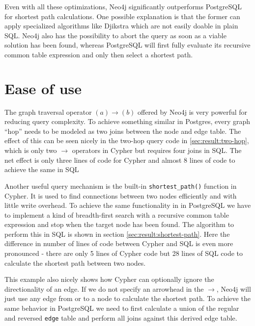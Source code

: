 \documentclass[11pt, a4paper,oneside,chapterprefix=false]{scrbook}
\begin{document}
Even with all these optimizations, Neo4j significantly outperforms PostgreSQL for shortest path calculations.
One possible explanation is that the former can apply specialized algorithms like Djikstra \cite{dijkstra} which are not easily doable in plain SQL. Neo4j also has the possibility to abort the query as soon as a viable solution has been found, whereas PostgreSQL will first fully evaluate its recursive common table expression and only then select a shortest path.

\section{Ease of use} \label{sec:convenience}

The graph traversal operator $(a) \rightarrow (b)$ offered by Neo4j is very powerful for reducing query complexity.
To achieve something similar in Postgres, every graph ``hop'' needs to be modeled as two joins between the node and edge table. The effect of this can be seen nicely in the two-hop query code in \ref{sec:result:two-hop}, which is only two $\rightarrow$ operators in Cypher but requires four joins in SQL. The net effect is only three lines of code for Cypher and almost 8 lines of code to achieve the same in SQL

Another useful query mechanism is the built-in \lstinline{shortest_path()} function in Cypher.
It is used to find connections between two nodes efficiently and with little write overhead.
To achieve the same functionality in in PostgreSQL we have to implement a kind of breadth-first search with a recursive common table expression and stop when the target node has been found.
The algorithm to perform this in SQL is shown in section \ref{sec:result:shortest-path}.
Here the difference in number of lines of code between Cypher and SQL is even more pronounced - there are only 5 lines of Cypher code but 28 lines of SQL code to calculate the shortest path between two nodes.

This example also nicely shows how Cypher can optionally ignore the directionality of an edge.
If we do not specify an arrowhead in the $\rightarrow$, Neo4j will just use any edge from or to a node to calculate the shortest path.
To achieve the same behavior in PostgreSQL we need to first calculate a union of the regular and reversed \lstinline{edge} table and perform all joins against this derived edge table.
\end{document}

